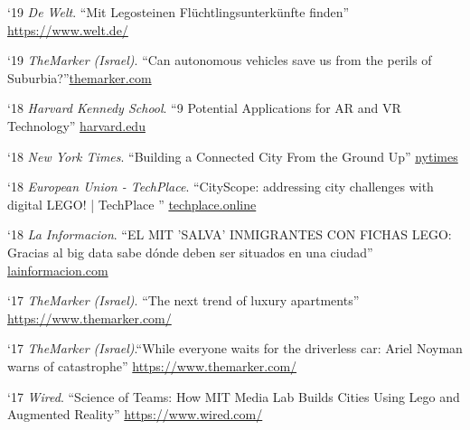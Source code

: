 \begin{tablist}
    \item[`19] \tab \textit{De Welt}. \enquote{Mit Legosteinen Flüchtlingsunterkünfte finden}
    \href{https://www.welt.de/regionales/hamburg/article152836431/Mit-Legosteinen-Fluechtlingsunterkuenfte-finden.html}{https://www.welt.de/}

    \item[`19] \tab \textit{TheMarker (Israel)}. \enquote{Can autonomous vehicles save us from the perils of Suburbia?}\href{https://www.themarker.com/magazine/.premium-MAGAZINE-1.6985623}{themarker.com}

    \item[`18] \tab \textit{Harvard Kennedy School}. \enquote{9 Potential Applications for AR and VR Technology}
    \href{https://datasmart.ash.harvard.edu/news/article/9-potential-applications-ar-and-vr-technology}{harvard.edu}

    \item[`18] \tab \textit{New York Times}. \enquote{Building a Connected City From the Ground Up}
    \href{https://www.nytimes.com/2018/04/03/business/smart-city.html}{nytimes}

    \item[`18] \tab \textit{European Union - TechPlace}. \enquote{CityScope: addressing city challenges with digital LEGO! | TechPlace }
    \href{https://www.techplace.online/cityscope-addressing-city-challenges-with-digital-lego/}{techplace.online}

    \item[`18] \tab \textit{La Informacion}. \enquote{EL MIT 'SALVA' INMIGRANTES CON FICHAS LEGO: Gracias al big data sabe dónde deben ser situados en una ciudad} \href{https://www.lainformacion.com/tecnologia/el-mit-salva-inmigrantes-con-fichas-lego-gracias-al-big-data-sabe-donde-deben-ser-situados-en-una-ciudad/6351916/}{lainformacion.com}

    \item[`17] \tab \textit{TheMarker (Israel)}. \enquote{The next trend of luxury apartments}
    \href{https://www.themarker.com/realestate/1.4456551}{https://www.themarker.com/}

    \item[`17] \tab \textit{TheMarker (Israel)}.\enquote{While everyone waits for the driverless car: Ariel Noyman warns of catastrophe}
    \href{https://www.themarker.com/markerweek/1.4008478}{https://www.themarker.com/}

    \item[`17] \tab \textit{Wired}. \enquote{Science of Teams: How MIT Media Lab Builds Cities Using Lego and Augmented Reality}
    \href{https://www.wired.com/video/watch/science-of-teams-mit-media-lab}{https://www.wired.com/}


\end{tablist}

